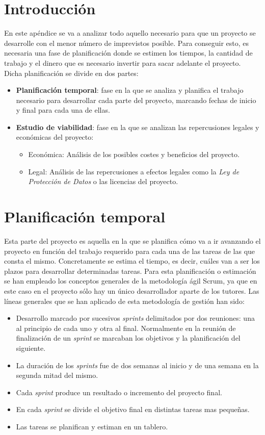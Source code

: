 
\section{Introducción}
En este apéndice se va a analizar todo aquello necesario para que un proyecto se desarrolle con el menor número de imprevistos posible. Para conseguir esto, es necesaria una fase de planificación donde se estimen los tiempos, la cantidad de trabajo y el dinero que es necesario invertir para sacar adelante el proyecto.
Dicha planificación se divide en dos partes:
\begin{itemize}
	\item \textbf{Planificación temporal}: fase en la que se analiza y planifica el trabajo necesario para desarrollar cada parte del proyecto, marcando fechas de inicio y final para cada una de ellas.
	\item \textbf{Estudio de viabilidad}: fase en la que se analizan las repercusiones legales y económicas del proyecto:
	\begin{itemize}
		\item Económica: Análisis de los posibles costes y beneficios del proyecto.
		\item Legal: Análisis de las repercusiones a efectos legales como la \textit{Ley de Protección de Datos} o las licencias del proyecto.
	\end{itemize}
\end{itemize}

\section{Planificación temporal}\label{sec:planificacion-temporal}
Esta parte del proyecto es aquella en la que se planifica cómo va a ir avanzando el proyecto en función del trabajo requerido para cada una de las tareas de las que consta el mismo.
Concretamente se estima el tiempo, es decir, cuáles van a ser los plazos para desarrollar determinadas tareas.
Para esta planificación o estimación se han empleado los conceptos generales de la metodología ágil Scrum, ya que en este caso en el proyecto sólo hay un único desarrollador aparte de los tutores. Las líneas generales que se han aplicado de esta metodología de gestión han sido:
\begin{itemize}
	\tightlist
	\item
	Desarrollo marcado por sucesivos \emph{sprints} delimitados por dos reuniones: una al principio de cada uno y otra al final. Normalmente en la reunión de finalización de un \emph{sprint} se marcaban los objetivos y la planificación del siguiente.
	\item
	La duración de los \emph{sprints} fue de dos semanas al inicio y de una semana en la segunda mitad del mismo.
	\item
	Cada \emph{sprint} produce un resultado o incremento del proyecto final.
	\item
	En cada \emph{sprint} se divide el objetivo final en distintas tareas mas pequeñas.
	\item
	Las tareas se planifican y estiman en un tablero.
\end{itemize}

